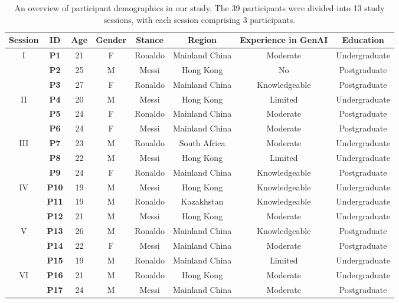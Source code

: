 \begin{table*}
  \caption{An overview of participant demographics in our study. The 39 participants were divided into 13 study sessions, with each session comprising 3 participants.}
  \label{table1}
  \begin{tabular}{cccccccc}
    \toprule
    \textbf{Session} & \textbf{ID} & \textbf{Age} & \textbf{Gender} & \textbf{Stance} & \textbf{Region} & \textbf{Experience in GenAI} & \textbf{Education}\\
    \midrule
    I  & \textbf{P1} & 21 & F & Ronaldo & Mainland China & Moderate & Undergraduate\\
       & \textbf{P2} & 25 & M & Messi & Hong Kong & No & Postgraduate\\
       & \textbf{P3} & 27 & F & Ronaldo & Mainland China & Knowledgeable & Postgraduate\\
    \hline
    II & \textbf{P4} & 20 & M & Messi & Hong Kong & Limited & Undergraduate\\
       & \textbf{P5} & 24 & F & Ronaldo & Mainland China & Moderate & Postgraduate\\
       & \textbf{P6} & 24 & F & Messi & Mainland China & Moderate & Postgraduate\\
    \hline
    III & \textbf{P7} & 23 & M & Ronaldo & South Africa & Moderate & Undergraduate\\
        & \textbf{P8} & 22 & M & Messi & Hong Kong & Limited & Undergraduate\\
        & \textbf{P9} & 24 & F & Ronaldo & Mainland China & Knowledgeable & Postgraduate\\
    \hline
    IV & \textbf{P10} & 19 & M & Messi & Hong Kong & Knowledgeable & Undergraduate\\
       & \textbf{P11} & 19 & M & Ronaldo & Kazakhstan & Knowledgeable & Undergraduate\\
       & \textbf{P12} & 21 & M & Messi & Hong Kong & Moderate & Undergraduate\\
    \hline
    V  & \textbf{P13} & 26 & M & Ronaldo & Mainland China & Knowledgeable & Postgraduate\\
       & \textbf{P14} & 22 & F & Messi & Mainland China & Moderate & Postgraduate\\
       & \textbf{P15} & 19 & M & Ronaldo & Mainland China & Limited & Undergraduate\\
    \hline
    VI & \textbf{P16} & 21 & M & Ronaldo & Hong Kong & Moderate & Undergraduate \\
       & \textbf{P17} & 24 & M & Messi & Mainland China & Moderate & Postgraduate\\

\end{tabular}
\end{table*}
